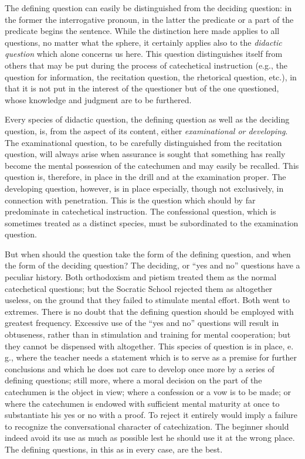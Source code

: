 The defining question can easily be distinguished from the deciding question: in the former the interrogative pronoun, in the latter the predicate or a part of the predicate begins the sentence. While the distinction here made applies to all questions, no matter what the sphere, it certainly applies also to the \emph{didactic question} which alone concerns us here. This question distinguishes itself from others that may be put during the process of catechetical instruction (e.g., the question for information, the recitation question, the rhetorical question, etc.), in that it is not put in the interest of the questioner but of the one questioned, whose knowledge and judgment are to be furthered.

Every species of didactic question, the defining question as well as the deciding question, is, from the aspect of its content, either \emph{examinational or developing}. The examinational question, to be carefully distinguished from the recitation question, will always arise when assurance is sought that something has really become the mental possession of the catechumen and may easily be recalled. This question is, therefore, in place in the drill and at the examination proper. The developing
question, however, is in place especially, though not exclusively, in connection with penetration. This is the question which should by far predominate in catechetical instruction. The confessional question, which is sometimes treated as a distinct species, must be subordinated to the examination question.

But when should the question take the form of the defining question, and when the form of the deciding question? The deciding, or “yes and no” questions have a peculiar history. Both orthodoxism and pietism treated them as the normal catechetical questions; but the Socratic School rejected them as altogether useless, on the ground that they failed to stimulate mental effort. Both went to extremes. There is no doubt that the defining question should be employed with greatest frequency. Excessive use of the “yes and no” questions will result in obtuseness, rather than in stimulation and training for mental cooperation; but they cannot be dispensed with altogether. This species of question is in place, e. g., where the teacher needs a statement which is to serve as a premise for further conclusions and which he does not care to develop once more by a series of defining questions; still more, where a moral decision on the part of the catechumen is the object in view; where a confession or a vow is to be made; or where the catechumen is endowed with sufficient mental maturity at once to substantiate his yes or no with a proof. To reject it entirely would imply a failure to recognize the conversational character of catechization. The beginner should indeed avoid its use as much as possible lest he should use it at the wrong place. The defining questions, in this as in every case, are the best.

